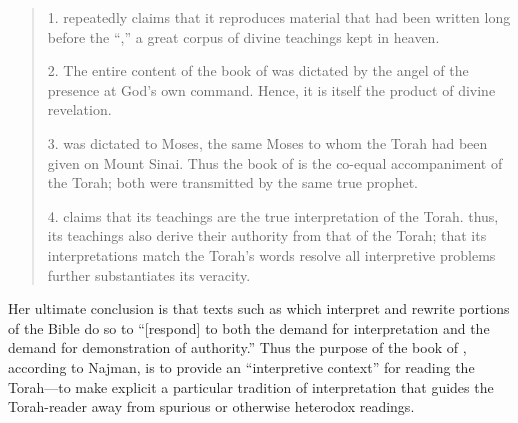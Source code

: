     \begin{quote}
        1. \jub repeatedly claims that it reproduces material that had been written long before the ``\heavenlytablets,'' a great corpus of divine teachings kept in heaven.

        2. The entire content of the book of \jub was dictated by the angel of the presence at God's own command. Hence, it is itself the product of divine revelation.

        3. \jub was dictated to Moses, the same Moses to whom the Torah had been given on Mount Sinai. Thus the book of \jub is the co-equal accompaniment of the Torah; both were transmitted by the same true prophet.

        4. \jub claims that its teachings are the true interpretation of the Torah. thus, its teachings also derive their authority from that of the Torah; that its interpretations match the Torah's words resolve all interpretive problems further substantiates its veracity.%
        \autocite[380]{najman_jsj1999}
    \end{quote}
\noindent
Her ultimate conclusion is that texts such as \jub which interpret and rewrite portions of the Bible do so to ``[respond] to both the demand for interpretation and the demand for demonstration of authority.''\autocite[408]{najman_jsj1999} Thus the purpose of the book of \jub, according to Najman, is to provide an ``interpretive context'' for reading the Torah---to make explicit a particular tradition of interpretation that guides the Torah-reader away from spurious or otherwise heterodox readings. 

